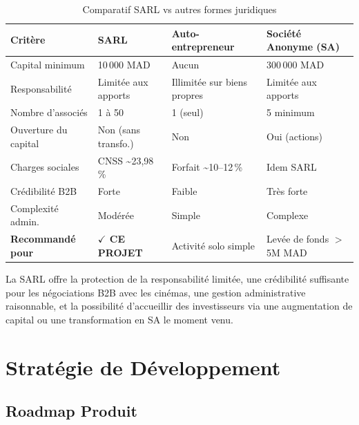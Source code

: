\documentclass[12pt,a4paper,openany]{report}
\begin{document}
\begin{table}[H]
\centering
\small
\begin{tabularx}{\textwidth}{Xp{3.2cm}p{3.2cm}p{3.5cm}}
\toprule
\textbf{Critère} & \textbf{SARL} & \textbf{Auto-entrepreneur} & \textbf{Société Anonyme (SA)} \\
\midrule
Capital minimum      & 10\,000 MAD          & Aucun                      & 300\,000 MAD \\
Responsabilité       & Limitée aux apports  & Illimitée sur biens propres& Limitée aux apports \\
Nombre d'associés    & 1 à 50               & 1 (seul)                   & 5 minimum \\
Ouverture du capital & Non (sans transfo.)  & Non                        & Oui (actions) \\
Charges sociales     & CNSS \textasciitilde{}23,98\,\% & Forfait \textasciitilde{}10–12\,\% & Idem SARL \\
Crédibilité B2B      & Forte                & Faible                     & Très forte \\
Complexité admin.    & Modérée              & Simple                     & Complexe \\
\textbf{Recommandé pour} & \textbf{$\checkmark$ CE PROJET} & Activité solo simple & Levée de fonds $>$ 5M MAD \\
\bottomrule
\end{tabularx}
\caption{Comparatif SARL vs autres formes juridiques}
\label{tab:formes_juridiques}
\end{table}

La SARL offre la protection de la responsabilité limitée, une crédibilité suffisante pour les négociations B2B avec les cinémas, une gestion administrative raisonnable, et la possibilité d'accueillir des investisseurs via une augmentation de capital ou une transformation en SA le moment venu.

\section{Stratégie de Développement}

\subsection{Roadmap Produit}
\end{document}
